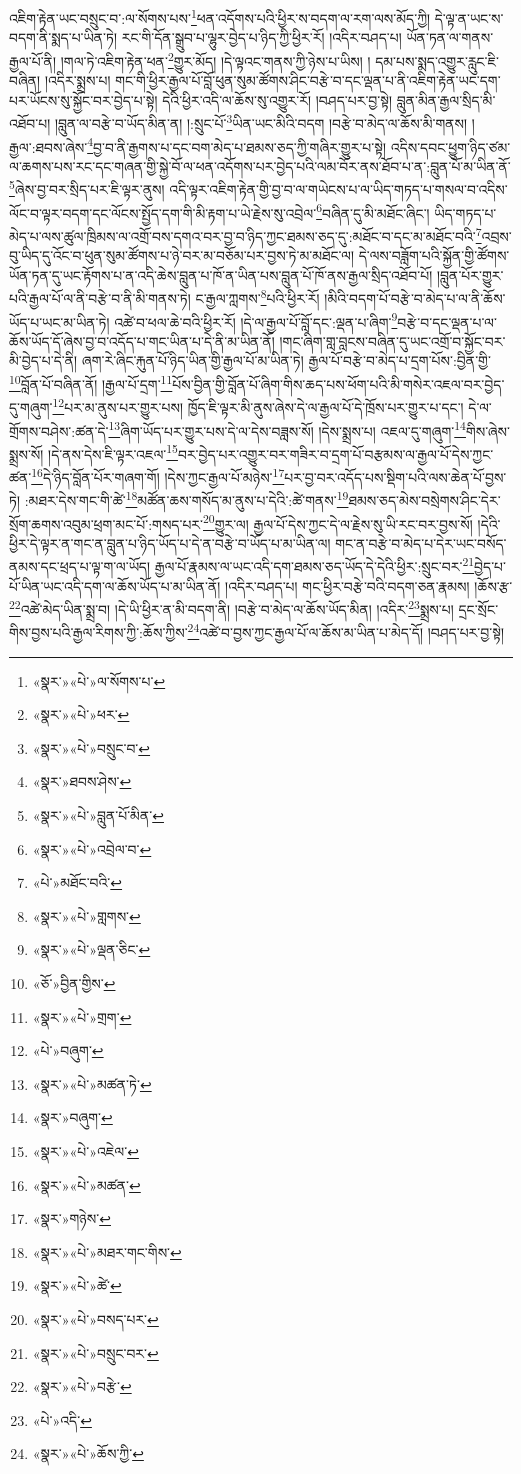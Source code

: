 འཇིག་རྟེན་ཡང་བསྲུང་བ་:ལ་སོགས་པས་\footnote{«སྣར་»«པེ་»ལ་སོགས་པ་}ཕན་འདོགས་པའི་ཕྱིར་ས་བདག་ལ་རག་ལས་མོད་ཀྱི། དེ་ལྟ་ན་ཡང་ས་བདག་ནི་སྨད་པ་ཡིན་ཏེ། རང་གི་དོན་སྒྲུབ་པ་ལྷུར་བྱེད་པ་ཉིད་ཀྱི་ཕྱིར་རོ། །འདིར་བཤད་པ། ཡོན་ཏན་ལ་གནས་རྒྱལ་པོ་ནི། །གལ་ཏེ་འཇིག་རྟེན་ཕན་\footnote{«སྣར་»«པེ་»ཕར་}གྱུར་མོད། །དེ་ལྟའང་གནས་ཀྱི་ཉེས་པ་ཡིས། །
དམ་པས་སྨད་འགྱུར་རླུང་ཇི་བཞིན། །འདིར་སྨྲས་པ། གང་གི་ཕྱིར་རྒྱལ་པོ་བློ་ཕུན་སུམ་ཚོགས་ཤིང་བརྩེ་བ་དང་ལྡན་པ་ནི་འཇིག་རྟེན་ཡང་དག་པར་ཡོངས་སུ་སྐྱོང་བར་བྱེད་པ་སྟེ། དེའི་ཕྱིར་འདི་ལ་ཆོས་སུ་འགྱུར་རོ། །བཤད་པར་བྱ་སྟེ། བླུན་མིན་རྒྱལ་སྲིད་མི་འཐོབ་པ། །བླུན་ལ་བརྩེ་བ་ཡོད་མིན་ན། །:སྲུང་པོ་\footnote{«སྣར་»«པེ་»བསྲུང་བ་}ཡིན་ཡང་མིའི་བདག །བརྩེ་བ་མེད་ལ་ཆོས་མི་གནས། །རྒྱལ་:ཐབས་ཞེས་\footnote{«སྣར་»ཐབས་ཤེས་}བྱ་བ་ནི་རྒྱགས་པ་དང་བག་མེད་པ་ཐམས་ཅད་ཀྱི་གཞིར་གྱུར་པ་སྟེ། འདིས་དབང་ཕྱུག་ཉིད་ཙམ་ལ་ཆགས་པས་རང་དང་གཞན་གྱི་སྐྱེ་བོ་ལ་ཕན་འདོགས་པར་བྱེད་པའི་ལམ་བོར་ནས་ཐོབ་པ་ན་:བླུན་པོ་མ་ཡིན་ནོ་\footnote{«སྣར་»«པེ་»བླུན་པོ་མིན་}ཞེས་བྱ་བར་སྲིད་པར་ཇི་ལྟར་ནུས། འདི་ལྟར་འཇིག་རྟེན་གྱི་བྱ་བ་ལ་གཡེངས་པ་ལ་ཡིད་གཏད་པ་གསལ་བ་འདིས་ལོང་བ་ལྟར་བདག་དང་ལོངས་སྤྱོད་དག་གི་མི་རྟག་པ་ཡེ་རྗེས་སུ་འབྲེལ་\footnote{«སྣར་»«པེ་»འབྲེལ་བ་}བཞིན་དུ་མི་མཐོང་ཞིང་། ཡིད་གཏད་པ་མེད་པ་ལས་ཚུལ་ཁྲིམས་ལ་འགྲོ་བས་དགའ་བར་བྱ་བ་ཉིད་ཀྱང་ཐམས་ཅད་དུ་:མཐོང་བ་དང་མ་མཐོང་བའི་\footnote{«པེ་»མཐོང་བའི་}འབྲས་བུ་ཡིད་དུ་འོང་བ་ཕུན་སུམ་ཚོགས་པ་ཉེ་བར་མ་བཅོམ་པར་བྱས་ཏེ་མ་མཐོང་ལ། དེ་ལས་བཟློག་པའི་སྐྱོན་གྱི་ཚོགས་ཡོན་ཏན་དུ་ཡང་རྟོགས་པ་ན་འདི་ཆེས་བླུན་པ་ཁོ་ན་ཡིན་པས་བླུན་པོ་ཁོ་ནས་རྒྱལ་སྲིད་འཐོབ་པོ། །བླུན་པོར་གྱུར་པའི་རྒྱལ་པོ་ལ་ནི་བརྩེ་བ་ནི་མི་གནས་ཏེ། ང་རྒྱལ་ཀླགས་\footnote{«སྣར་»«པེ་»གླགས་}པའི་ཕྱིར་རོ། །མིའི་བདག་པོ་བརྩེ་བ་མེད་པ་ལ་ནི་ཆོས་ཡོད་པ་ཡང་མ་ཡིན་ཏེ། འཚེ་བ་ཕལ་ཆེ་བའི་ཕྱིར་རོ། །དེ་ལ་རྒྱལ་པོ་བློ་དང་:ལྡན་པ་ཞིག་\footnote{«སྣར་»«པེ་»ལྡན་ཅིང་}བརྩེ་བ་དང་ལྡན་པ་ལ་ཆོས་ཡོད་དོ་ཞེས་བྱ་བ་འདོད་པ་གང་ཡིན་པ་དེ་ནི་མ་ཡིན་ནོ། །གང་ཞིག་གླ་བླངས་བཞིན་དུ་ཡང་འགྲོ་བ་སྐྱོང་བར་མི་བྱེད་པ་དེ་ནི། ཞག་རེ་ཞིང་རྐུན་པོ་ཉིད་ཡིན་གྱི་རྒྱལ་པོ་མ་ཡིན་ཏེ། རྒྱལ་པོ་བརྩེ་བ་མེད་པ་དྲག་པོས་:བྱིན་གྱི་\footnote{«ཅོ་»བྱིན་གྱིས་}བློན་པོ་བཞིན་ནོ། །རྒྱལ་པོ་དྲག་\footnote{«སྣར་»«པེ་»གྲག་}པོས་བྱིན་གྱི་བློན་པོ་ཞིག་གིས་ཆད་པས་ཕོག་པའི་མི་གསེར་འཇལ་བར་བྱེད་དུ་གཞུག་\footnote{«པེ་»བཞུག་}པར་མ་ནུས་པར་གྱུར་པས། ཁྱོད་ཇི་ལྟར་མི་ནུས་ཞེས་དེ་ལ་རྒྱལ་པོ་དེ་ཁྲོས་པར་གྱུར་པ་དང་། དེ་ལ་གྲོགས་བཤེས་:ཚན་དེ་\footnote{«སྣར་»«པེ་»མཚན་ཏེ་}ཞིག་ཡོད་པར་གྱུར་པས་དེ་ལ་དེས་བཟླས་སོ། །དེས་སྨྲས་པ། འཇལ་དུ་གཞུག་\footnote{«སྣར་»བཞུག་}གིས་ཞེས་སྨྲས་སོ། །དེ་ནས་དེས་ཇི་ལྟར་འཇལ་\footnote{«སྣར་»«པེ་»འཇེལ་}བར་བྱེད་པར་འགྱུར་བར་གཟིར་བ་དྲག་པོ་བརྩམས་ལ་རྒྱལ་པོ་དེས་ཀྱང་ཚན་\footnote{«སྣར་»«པེ་»མཚན་}དེ་ཉིད་བློན་པོར་གཞག་གོ། །དེས་ཀྱང་རྒྱལ་པོ་མཉེས་\footnote{«སྣར་»གཉེས་}པར་བྱ་བར་འདོད་པས་སྡིག་པའི་ལས་ཆེན་པོ་བྱས་ཏེ། :མཐར་དེས་གང་གི་ཚེ་\footnote{«སྣར་»«པེ་»མཐར་གང་གིས་}མཚོན་ཆས་གསོད་མ་ནུས་པ་དེའི་:ཚེ་གནས་\footnote{«སྣར་»«པེ་»ཚེ་}ཐམས་ཅད་མེས་བསྲེགས་ཤིང་དེར་སྲོག་ཆགས་འབུམ་ཕྲག་མང་པོ་:གསད་པར་\footnote{«སྣར་»«པེ་»བསད་པར་}གྱུར་ལ། རྒྱལ་པོ་དེས་ཀྱང་དེ་ལ་རྗེས་སུ་ཡི་རང་བར་བྱས་སོ། །དེའི་ཕྱིར་དེ་ལྟར་ན་གང་ན་བླུན་པ་ཉིད་ཡོད་པ་དེ་ན་བརྩེ་བ་ཡོད་པ་མ་ཡིན་ལ། གང་ན་བརྩེ་བ་མེད་པ་དེར་ཡང་བསོད་ནམས་དང་ཕྲད་པ་ལྟ་ག་ལ་ཡོད། རྒྱལ་པོ་རྣམས་ལ་ཡང་འདི་དག་ཐམས་ཅད་ཡོད་དེ་དེའི་ཕྱིར་:སྲུང་བར་\footnote{«སྣར་»«པེ་»བསྲུང་བར་}བྱེད་པ་པོ་ཡིན་ཡང་འདི་དག་ལ་ཆོས་ཡོད་པ་མ་ཡིན་ནོ། །འདིར་བཤད་པ། གང་ཕྱིར་བརྩེ་བའི་བདག་ཅན་རྣམས། །ཆོས་རྩ་\footnote{«སྣར་»«པེ་»བརྩེ་}འཚེ་མེད་ཡིན་སྨྲ་བ། །དེ་ཡི་ཕྱིར་ན་མི་བདག་ནི། །བརྩེ་བ་མེད་ལ་ཆོས་ཡོད་མིན། །འདིར་\footnote{«པེ་»འདི་}སྨྲས་པ། དྲང་སྲོང་གིས་བྱས་པའི་རྒྱལ་རིགས་ཀྱི་:ཆོས་ཀྱིས་\footnote{«སྣར་»«པེ་»ཆོས་ཀྱི་}འཚེ་བ་བྱས་ཀྱང་རྒྱལ་པོ་ལ་ཆོས་མ་ཡིན་པ་མེད་དོ། །བཤད་པར་བྱ་སྟེ། 